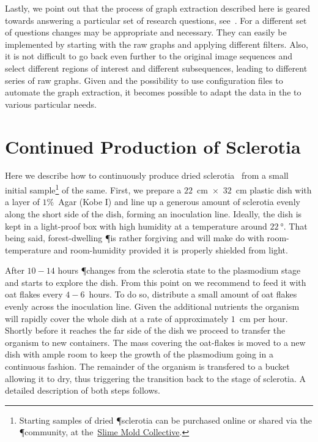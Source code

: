 		Lastly, we point out that the process of graph extraction described here is geared towards answering a particular set of research questions, see~\cite{dirnberger2016}. For a different set of questions changes may be appropriate and necessary. They can easily be implemented by starting with the raw graphs and applying different filters. Also, it is not difficult to go back even further to the original image sequences and select different regions of interest and different subsequences, leading to different series of raw graphs. Given \NEFI and the possibility to use configuration files to automate the graph extraction, it becomes possible to adapt the data in the \data to various particular needs.

	\section{Continued Production of Sclerotia}

		Here we describe how to continuously produce dried sclerotia~\cite{lifecycle} from a small initial sample\footnote{Starting samples of dried \P sclerotia can be purchased online or shared via the \P community, \eg at the~\href{http://slimoco.ning.com/}{Slime Mold Collective}.} of the same. First, we prepare a $22$~cm~$\times$~$32$~cm plastic dish with a layer of $1 \%$~Agar (Kobe I) and line up a generous amount of sclerotia evenly along the short side of the dish, forming an inoculation line. Ideally, the dish is kept in a light-proof box with high humidity at a temperature around $\SI{22}{\degree}$. That being said, forest-dwelling \P is rather forgiving and will make do with room-temperature and room-humidity provided it is properly shielded from light.

		After $10-14$ hours \P changes from the sclerotia state to the plasmodium stage and starts to explore the dish. From this point on we recommend to feed it with oat flakes every $4-6$~hours. To do so, distribute a small amount of oat flakes evenly across the inoculation line. Given the additional nutrients the organism will rapidly cover the whole dish at a rate of approximately $1$~cm per hour. Shortly before it reaches the far side of the dish we proceed to transfer the organism to new containers. The mass covering the oat-flakes is moved to a new dish with ample room to keep the growth of the plasmodium going in a continuous fashion. The remainder of the organism is transfered to a bucket allowing it to dry, thus triggering the transition back to the stage of sclerotia. A detailed description of both steps follows.

